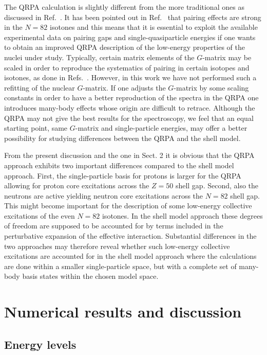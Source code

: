 The QRPA calculation is slightly different from the more traditional
ones as discussed
in Ref.\ \cite{suh94}.
It has been 
pointed out in Ref.\ \cite{acgp90} that pairing effects are strong 
in the $N=82$ isotones and this means 
that it is essential to exploit the 
available experimental data on pairing gaps and single-quasiparticle energies 
if one wants to 
obtain an improved QRPA description of the low-energy properties of the 
nuclei under study. 
Typically, certain matrix elements of the $G$-matrix may be scaled
in order to reproduce the systematics of pairing in certain 
isotopes and isotones, as done in Refs.\ \cite{suh94,suh95,ber95}.
However, in this work we have not
performed such a refitting of the nuclear $G$-matrix.
If one adjusts the $G$-matrix by some scaling constants in order
to have a better reproduction of the spectra in the QRPA one introduces
many-body effects whose origin are difficult to retrace. Although
the QRPA may not give the best results for the spectroscopy, 
we feel that an equal starting point, same $G$-matrix and single-particle
energies, may offer a better possibility
for studying differences between the QRPA and the shell model.

 From the present discussion and the one in Sect. 2 it is obvious that
the QRPA approach exhibits two important differences compared
to the shell model approach.
First, the single-particle basis
for protons is larger for the QRPA allowing for proton
core excitations across the $Z=50$ shell gap. Second, also the neutrons are
active  yielding neutron core excitations across the $N=82$ shell gap. This
might become important for the description of some low-energy collective
excitations of the even $N=82$ isotones. In the shell model approach
these degrees of freedom are supposed to be accounted for by terms
included in the perturbative expansion of the effective interaction.
Substantial differences in the two approaches may therefore
reveal whether such low-energy collective excitations are accounted
for in the shell model approach where the calculations are
done within a smaller single-particle space, but with a complete
set of many-body basis states within the chosen model space. 




\section{Numerical results and discussion}

\subsection{Energy levels}

